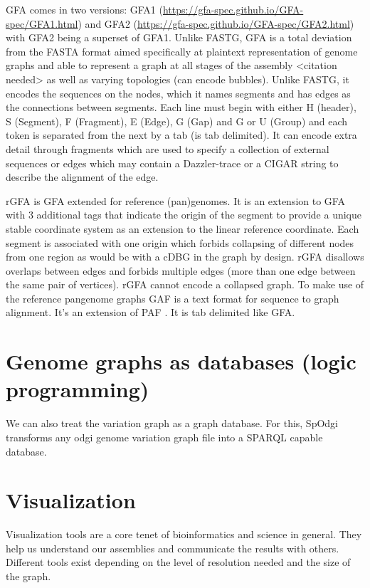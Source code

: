 \documentclass[11pt]{article}
\begin{document}
GFA \cite{liMinimapMiniasmFast2016} comes in two versions:
GFA1 (\url{https://gfa-spec.github.io/GFA-spec/GFA1.html}) and
GFA2 (\url{https://gfa-spec.github.io/GFA-spec/GFA2.html}) with GFA2 being a superset
of GFA1. 
Unlike FASTG, GFA is a total deviation from the FASTA format aimed specifically 
at plaintext representation of genome graphs and able to represent a graph at 
all stages of the assembly <citation needed> as well as varying topologies
(can encode bubbles).
Unlike FASTG, it encodes the sequences on the nodes, which it names segments and
has edges as the connections between segments. 
Each line must begin with either H (header), S (Segment), F (Fragment), E (Edge),
G (Gap) and G or U (Group) and each token is separated from the next by a tab
(is tab delimited). 
It can encode extra detail through fragments which are used to specify a
collection of external sequences or edges which may contain a Dazzler-trace or
a CIGAR string to describe the alignment of the edge.

rGFA \cite{liDesignConstructionReference2020} is GFA extended for reference 
(pan)genomes. It is an extension
to GFA with 3 additional tags that indicate the origin of the segment to
provide a unique stable coordinate system as an extension to the linear 
reference coordinate. Each segment is associated with one origin which forbids
collapsing of different nodes from one region as would be with a cDBG  in the
graph by design. rGFA disallows overlaps between edges and forbids multiple
edges (more than one edge between the same pair of vertices).
rGFA cannot encode a collapsed graph.
To make use of the reference pangenome graphs 
GAF \cite{liDesignConstructionReference2020} is a text format 
for sequence to graph alignment.
It’s an extension of PAF \cite{liMinimapMiniasmFast2016}. 
It is tab delimited like GFA. 

\section{Genome graphs as databases (logic programming)}
\label{sec:org434c086}
We can also treat the variation graph as a graph database. For this, SpOdgi 
 transforms any odgi genome variation graph file into a
SPARQL capable database.

\section{Visualization}
\label{sec:orgfe007e5}
Visualization tools are a core tenet of bioinformatics and science in general.
They help us understand our assemblies and communicate the results with others. 
Different tools exist depending on the level of resolution needed and 
the size of the graph. 
\end{document}
